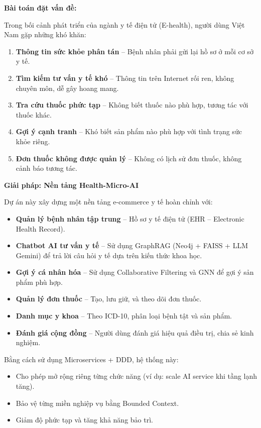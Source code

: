 \documentclass[12pt,a4paper]{article}
\begin{document}
\textbf{Bài toán đặt vấn đề:}

Trong bối cảnh phát triển của ngành y tế điện tử (E-health), người dùng Việt Nam gặp những khó khăn:

\begin{enumerate}
    \item \textbf{Thông tin sức khỏe phân tán} – Bệnh nhân phải gửi lại hồ sơ ở mỗi cơ sở y tế.
    
    \item \textbf{Tìm kiếm tư vấn y tế khó} – Thông tin trên Internet rối ren, không chuyên môn, dễ gây hoang mang.
    
    \item \textbf{Tra cứu thuốc phức tạp} – Không biết thuốc nào phù hợp, tương tác với thuốc khác.
    
    \item \textbf{Gợi ý cạnh tranh} – Khó biết sản phẩm nào phù hợp với tình trạng sức khỏe riêng.
    
    \item \textbf{Đơn thuốc không được quản lý} – Không có lịch sử đơn thuốc, không cảnh báo tương tác.
\end{enumerate}

\textbf{Giải pháp: Nền tảng Health-Micro-AI}

Dự án này xây dựng một nền tảng e-commerce y tế hoàn chỉnh với:

\begin{itemize}
    \item \textbf{Quản lý bệnh nhân tập trung} – Hồ sơ y tế điện tử (EHR – Electronic Health Record).
    \item \textbf{Chatbot AI tư vấn y tế} – Sử dụng GraphRAG (Neo4j + FAISS + LLM Gemini) để trả lời câu hỏi y tế dựa trên kiến thức khoa học.
    \item \textbf{Gợi ý cá nhân hóa} – Sử dụng Collaborative Filtering và GNN để gợi ý sản phẩm phù hợp.
    \item \textbf{Quản lý đơn thuốc} – Tạo, lưu giữ, và theo dõi đơn thuốc.
    \item \textbf{Danh mục y khoa} – Theo ICD-10, phân loại bệnh tật và sản phẩm.
    \item \textbf{Đánh giá cộng đồng} – Người dùng đánh giá hiệu quả điều trị, chia sẻ kinh nghiệm.
\end{itemize}

Bằng cách sử dụng Microservices + DDD, hệ thống này:
\begin{itemize}
    \item Cho phép mở rộng riêng từng chức năng (ví dụ: scale AI service khi tầng lạnh tăng).
    \item Bảo vệ từng miền nghiệp vụ bằng Bounded Context.
    \item Giảm độ phức tạp và tăng khả năng bảo trì.
\end{itemize}
\end{document}
